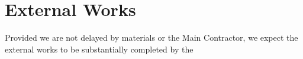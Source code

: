 
\chapter{External Works}

Provided we are not delayed by materials or the Main Contractor, we expect the external works to be substantially completed by the \deadline


